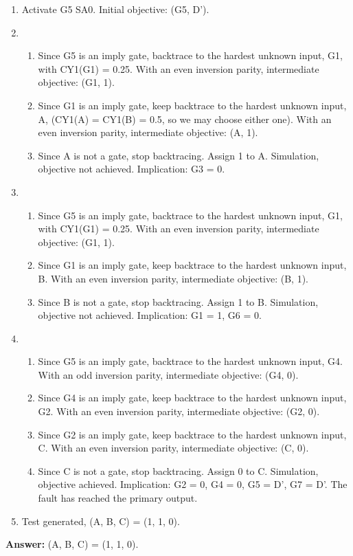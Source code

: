
\begin{enumerate}
  \item Activate G5 SA0. Initial objective: (G5, D').
  \item {
    \begin{enumerate}
      \item Since G5 is an imply gate, backtrace to the hardest unknown input, G1, with CY1(G1) = 0.25. With an even inversion parity, intermediate objective: (G1, 1).
      \item Since G1 is an imply gate, keep backtrace to the hardest unknown input, A, (CY1(A) = CY1(B) = 0.5, so we may choose either one). With an even inversion parity, intermediate objective: (A, 1).
      \item Since A is not a gate, stop backtracing. Assign 1 to A. Simulation, objective not achieved. Implication: G3 = 0.
    \end{enumerate}
  }
  \item {
    \begin{enumerate}
      \item Since G5 is an imply gate, backtrace to the hardest unknown input, G1, with CY1(G1) = 0.25. With an even inversion parity, intermediate objective: (G1, 1).
      \item Since G1 is an imply gate, keep backtrace to the hardest unknown input, B. With an even inversion parity, intermediate objective: (B, 1).
      \item Since B is not a gate, stop backtracing. Assign 1 to B. Simulation, objective not achieved. Implication: G1 = 1, G6 = 0.
    \end{enumerate}
  }
  \item {
    \begin{enumerate}
      \item Since G5 is an imply gate, backtrace to the hardest unknown input, G4. With an odd inversion parity, intermediate objective: (G4, 0).
      \item Since G4 is an imply gate, keep backtrace to the hardest unknown input, G2. With an even inversion parity, intermediate objective: (G2, 0).
      \item Since G2 is an imply gate, keep backtrace to the hardest unknown input, C. With an even inversion parity, intermediate objective: (C, 0).
      \item Since C is not a gate, stop backtracing. Assign 0 to C. Simulation, objective achieved. Implication: G2 = 0, G4 = 0, G5 = D', G7 = D'. The fault has reached the primary output.
    \end{enumerate}
  }
  \item Test generated, (A, B, C) = (1, 1, 0).

\end{enumerate}

\textbf{Answer:} (A, B, C) = (1, 1, 0).

